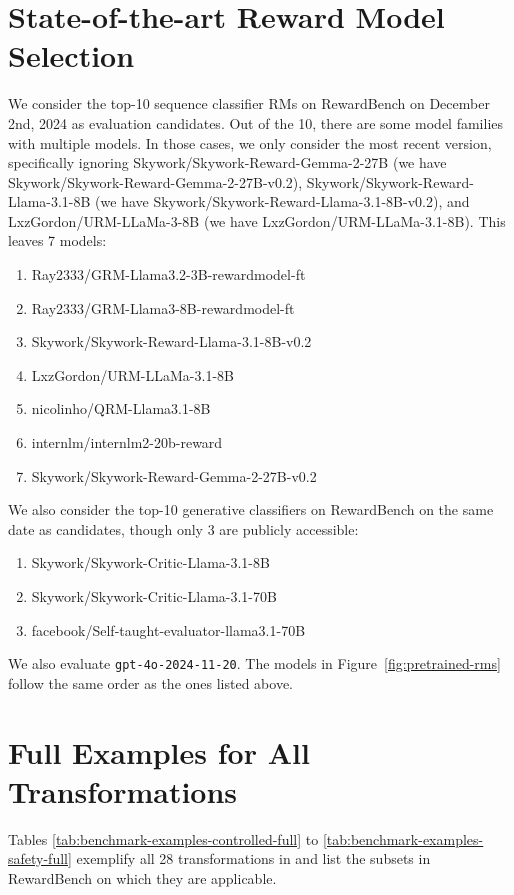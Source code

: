 \section{State-of-the-art Reward Model Selection} \label{sec:rm-selection}

We consider the top-10 sequence classifier RMs on RewardBench on December 2nd, 2024 as evaluation candidates.
Out of the 10, there are some model families with multiple models.
In those cases, we only consider the most recent version, specifically ignoring Skywork/Skywork-Reward-Gemma-2-27B (we have Skywork/Skywork-Reward-Gemma-2-27B-v0.2), Skywork/Skywork-Reward-Llama-3.1-8B (we have Skywork/Skywork-Reward-Llama-3.1-8B-v0.2), and LxzGordon/URM-LLaMa-3-8B (we have LxzGordon/URM-LLaMa-3.1-8B). This leaves 7 models:
\begin{enumerate}
    \item Ray2333/GRM-Llama3.2-3B-rewardmodel-ft
    \item Ray2333/GRM-Llama3-8B-rewardmodel-ft
    \item Skywork/Skywork-Reward-Llama-3.1-8B-v0.2
    \item LxzGordon/URM-LLaMa-3.1-8B
    \item nicolinho/QRM-Llama3.1-8B
    \item internlm/internlm2-20b-reward
    \item Skywork/Skywork-Reward-Gemma-2-27B-v0.2
\end{enumerate}

We also consider the top-10 generative classifiers on RewardBench on the same date as candidates, though only 3 are publicly accessible:
\begin{enumerate}
    \item Skywork/Skywork-Critic-Llama-3.1-8B
    \item Skywork/Skywork-Critic-Llama-3.1-70B
    \item facebook/Self-taught-evaluator-llama3.1-70B
\end{enumerate}

We also evaluate \texttt{gpt-4o-2024-11-20}.
The models in Figure~\ref{fig:pretrained-rms} follow the same order as the ones listed above.

\section{Full Examples for All Transformations} \label{sec:full-examples}

Tables \ref{tab:benchmark-examples-controlled-full} to \ref{tab:benchmark-examples-safety-full} exemplify all 28 transformations in \benchmark and list the subsets in RewardBench on which they are applicable.


